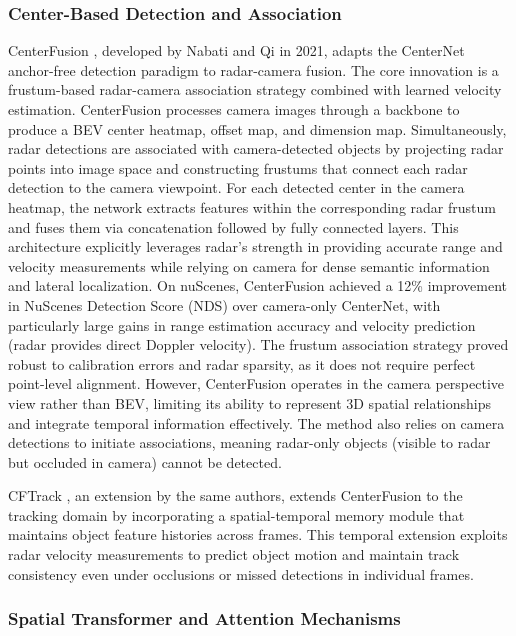 \subsubsection{Center-Based Detection and Association}

CenterFusion \cite{Nabati2021CenterFusion}, developed by Nabati and Qi in 2021, adapts the CenterNet anchor-free detection paradigm to radar-camera fusion. The core innovation is a frustum-based radar-camera association strategy combined with learned velocity estimation. CenterFusion processes camera images through a backbone to produce a BEV center heatmap, offset map, and dimension map. Simultaneously, radar detections are associated with camera-detected objects by projecting radar points into image space and constructing frustums that connect each radar detection to the camera viewpoint. For each detected center in the camera heatmap, the network extracts features within the corresponding radar frustum and fuses them via concatenation followed by fully connected layers. This architecture explicitly leverages radar's strength in providing accurate range and velocity measurements while relying on camera for dense semantic information and lateral localization. On nuScenes, CenterFusion achieved a 12\% improvement in NuScenes Detection Score (NDS) over camera-only CenterNet, with particularly large gains in range estimation accuracy and velocity prediction (radar provides direct Doppler velocity). The frustum association strategy proved robust to calibration errors and radar sparsity, as it does not require perfect point-level alignment. However, CenterFusion operates in the camera perspective view rather than BEV, limiting its ability to represent 3D spatial relationships and integrate temporal information effectively. The method also relies on camera detections to initiate associations, meaning radar-only objects (visible to radar but occluded in camera) cannot be detected.

CFTrack \cite{Nabati2021CFTrack}, an extension by the same authors, extends CenterFusion to the tracking domain by incorporating a spatial-temporal memory module that maintains object feature histories across frames. This temporal extension exploits radar velocity measurements to predict object motion and maintain track consistency even under occlusions or missed detections in individual frames.

\subsubsection{Spatial Transformer and Attention Mechanisms}

